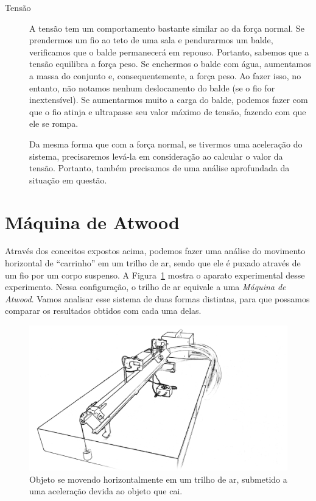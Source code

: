 \begin{description}
\item[Tensão] A tensão tem um comportamento bastante similar ao da força normal. Se prendermos um fio ao teto de uma sala e pendurarmos um balde, verificamos que o balde permanecerá em repouso. Portanto, sabemos que a tensão equilibra a força peso. Se enchermos o balde com água, aumentamos a massa do conjunto e, consequentemente, a força peso. Ao fazer isso, no entanto, não notamos nenhum deslocamento do balde (se o fio for inextensível). Se aumentarmos muito a carga do balde, podemos fazer com que o fio atinja e ultrapasse seu valor máximo de tensão, fazendo com que ele se rompa.

	Da mesma forma que com a força normal, se tivermos uma aceleração do sistema, precisaremos levá-la em consideração ao calcular o valor da tensão. Portanto, também precisamos de uma análise aprofundada da situação em questão.
\end{description}

\section{Máquina de Atwood}
\label{Sec:MaquinaDeAtwood}

Através dos conceitos expostos acima, podemos fazer uma análise do movimento horizontal de ``carrinho'' em um trilho de ar, sendo que ele é puxado através de um fio por um corpo suspenso. A Figura~\ref{FigTrilhoDeAr} mostra o aparato experimental desse experimento. Nessa configuração, o trilho de ar equivale a uma \emph{Máquina de Atwood}. Vamos analisar esse sistema de duas formas distintas, para que possamos comparar os resultados obtidos com cada uma delas.

\begin{figure}
\centering
\includegraphics[width=\textwidth]{Ilustrations/TrilhoAr.png}
\caption{Objeto se movendo horizontalmente em um trilho de ar, submetido a uma aceleração devida ao objeto que cai.}
\label{FigTrilhoDeAr}
\end{figure}


